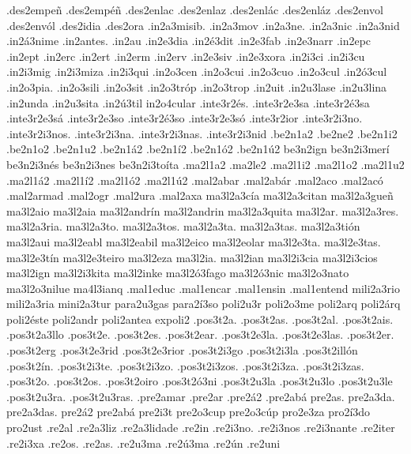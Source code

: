{.des2empeñ
.des2empéñ
.des2enlac
.des2enlaz
.des2enlác
.des2enláz
.des2envol
.des2envól
.des2idia
.des2ora
%
%
.in2a3misib.
.in2a3mov
.in2a3ne.
.in2a3nic
.in2a3nid
.in2á3nime
.in2antes.
.in2au
.in2e3dia
.in2é3dit
.in2e3fab
.in2e3narr
.in2epc
.in2ept
.in2erc
.in2ert
.in2erm
.in2erv
.in2e3siv
.in2e3xora
.in2i3ci
.in2i3cu
.in2i3mig
.in2i3miza
.in2i3qui
.in2o3cen
.in2o3cui
.in2o3cuo
.in2o3cul
.in2ó3cul
.in2o3pia.
.in2o3sili
.in2o3sit
.in2o3tróp
.in2o3trop
.in2uit
.in2u3lase
.in2u3lina
.in2unda
.in2u3sita
.in2ú3til
in2o4cular
%
%
.inte3r2és. .inte3r2e3sa .inte3r2é3sa .inte3r2e3sá .inte3r2e3so .inte3r2é3so .inte3r2e3só .inte3r2ior .inte3r2i3no. .inte3r2i3nos. .inte3r2i3na. .inte3r2i3nas. .inte3r2i3nid
%
.be2n1a2 .be2ne2 .be2n1i2 .be2n1o2 .be2n1u2 .be2n1á2        .be2n1í2 .be2n1ó2 .be2n1ú2
%
be3n2ign
be3n2i3merí
be3n2i3nés
be3n2i3nes
be3n2i3toíta
%
.ma2l1a2 .ma2le2 .ma2l1i2 .ma2l1o2 .ma2l1u2 .ma2l1á2        .ma2l1í2 .ma2l1ó2 .ma2l1ú2
%
.mal2abar
.mal2abár
.mal2aco
.mal2acó
.mal2armad
.mal2ogr
.mal2ura
.mal2axa
%
ma3l2a3cía
ma3l2a3citan
ma3l2a3gueñ
ma3l2aio
ma3l2aia
ma3l2andrín
ma3l2andrin
ma3l2a3quita
ma3l2ar.
ma3l2a3res.
ma3l2a3ria.
ma3l2a3to.
ma3l2a3tos.
ma3l2a3ta.
ma3l2a3tas.
ma3l2a3tión
ma3l2aui
ma3l2eabl
ma3l2eabil
ma3l2eico
ma3l2eolar
ma3l2e3ta.
ma3l2e3tas.
ma3l2e3tín
ma3l2e3teiro
ma3l2eza
ma3l2ia.
ma3l2ian
ma3l2i3cia
ma3l2i3cios
ma3l2ign
ma3l2i3kita
ma3l2inke
ma3l2ó3fago
ma3l2ó3nic
ma3l2o3nato
ma3l2o3nilue
ma4l3ianq
%
.mal1educ
.mal1encar
.mal1ensin
.mal1entend
%
%
mili2a3rio mili2a3ria
mini2a3tur
%
para2u3gas para2í3so
%
%
poli2u3r
poli2o3me
poli2arq
poli2árq
poli2éste
poli2andr
poli2antea
expoli2
%
.pos3t2a.
.pos3t2as.
.pos3t2al.
.pos3t2ais.
.pos3t2a3llo
.pos3t2e.
.pos3t2es.
.pos3t2ear.
.pos3t2e3la.
.pos3t2e3las.
.pos3t2er.
.pos3t2erg
.pos3t2e3rid
.pos3t2e3rior
.pos3t2i3go
.pos3t2i3la
.pos3t2illón
.pos3t2ín.
.pos3t2i3te.
.pos3t2i3zo.
.pos3t2i3zos.
.pos3t2i3za.
.pos3t2i3zas.
.pos3t2o.
.pos3t2os.
.pos3t2oiro
.pos3t2ó3ni
.pos3t2u3la
.pos3t2u3lo
.pos3t2u3le
.pos3t2u3ra.
.pos3t2u3ras.
%
%
.pre2amar
.pre2ar
.pre2á2
.pre2abá
%
pre2as.
pre2a3da.
pre2a3das.
pre2á2
pre2abá
pre2i3t
pre2o3cup
pre2o3cúp
%
%
pro2e3za
pro2í3do
pro2ust
%
%
.re2al .re2a3liz .re2a3lidade .re2in .re2i3no. .re2i3nos .re2i3nante .re2iter
.re2i3xa .re2os. .re2as. .re2u3ma .re2ú3ma .re2ún .re2uni
}
